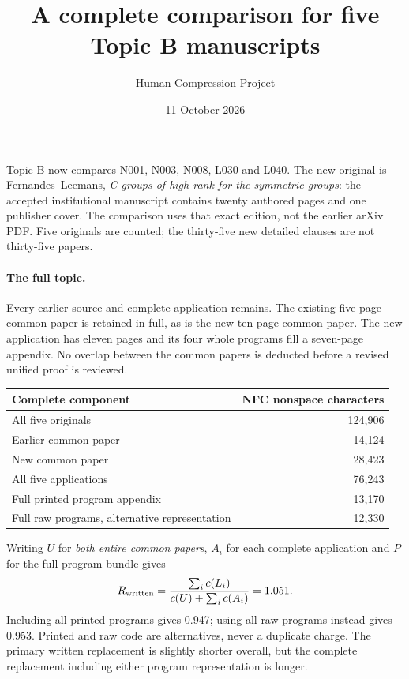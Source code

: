 \documentclass[11pt,a4paper]{article}
\title{A complete comparison for five Topic B manuscripts}
\author{Human Compression Project}\date{11 October 2026}
\begin{document}
\maketitle
Topic B now compares N001, N003, N008, L030 and L040. The new original is Fernandes--Leemans, \emph{C-groups of high rank for the symmetric groups}: the accepted institutional manuscript contains twenty authored pages and one publisher cover. The comparison uses that exact edition, not the earlier arXiv PDF. Five originals are counted; the thirty-five new detailed clauses are not thirty-five papers.

\paragraph{The full topic.}
Every earlier source and complete application remains. The existing five-page common paper is retained in full, as is the new ten-page common paper. The new application has eleven pages and its four whole programs fill a seven-page appendix. No overlap between the common papers is deducted before a revised unified proof is reviewed.
\begin{center}\begin{tabular}{lr}\toprule
Complete component & NFC nonspace characters\\\midrule
All five originals & 124,906\\
Earlier common paper & 14,124\\
New common paper & 28,423\\
All five applications & 76,243\\
Full printed program appendix & 13,170\\
Full raw programs, alternative representation & 12,330\\\bottomrule
\end{tabular}\end{center}
Writing $U$ for \emph{both entire common papers}, $A_i$ for each complete application and $P$ for the full program bundle gives
\[
R_{\rm written}=\frac{\sum_i c(L_i)}{c(U)+\sum_i c(A_i)}=1.051.
\]
Including all printed programs gives 0.947; using all raw programs instead gives 0.953. Printed and raw code are alternatives, never a duplicate charge. The primary written replacement is slightly shorter overall, but the complete replacement including either program representation is longer.
\end{document}
